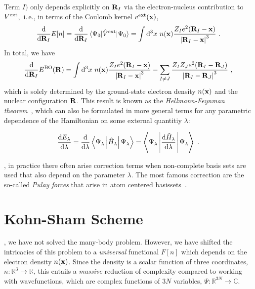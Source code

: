 Term $I)$ only depends explicitly on ${\bf R}_I$ via the electron-nucleus contribution to $V^{\rm ext}$,~i.\,e., in terms of the Coulomb kernel $v^{\rm ext} ({\bf x})$,
\begin{align}
	\frac{{\rm d}}{{\rm d} {\bf R}_I} E[n]
		= \frac{{\rm d}}{{\rm d} {\bf R}_I} \braket{\Psi_0 | \hat V ^{\rm ext} | \Psi_0} 
		= \int {\rm d}^3 x ~ n({\bf x}) \frac{Z_I e^2 ({\bf R}_I - {\bf x})}{\left\lvert {\bf R}_I - {\bf x} \right\rvert^3}~.
\end{align}
In total, we have
\begin{align}
	\frac{\d}{\d {\bf R}_I} E^{\rm BO} ({\bf R})
	= \int \d^3 x ~ n({\bf x}) \frac{Z_I e^2 ({\bf R}_I - {\bf x})}{\left\lvert {\bf R}_I - {\bf x} \right\rvert^3}
	- \sum_{I \neq J} \frac{Z_I Z_J e^2 ({\b R}_{I}-{\bf R}_{J})}{
		\left\lvert {\bf R}_{I}-{\bf R}_{J} \right\rvert^3}~,
	\label{eq:hellmannfeynman.force}
\end{align}
which is solely determined by the ground-state electron density $n ({\bf x})$ and the nuclear configuration $\bf R$. This result is known as the \emph{Hellmann-Feynman theorem}~\cite{Hellmann2015,Feynman1939}, which can also be formulated in more general terms for any parametric dependence of the Hamiltonian on some external quantitiy $\lambda$:
\begin{theorem}
\begin{align}
	\frac{{\rm d} E_{\lambda}}{{\rm d} \lambda}
		= \frac{{\rm d}}{{\rm d} \lambda}\left\langle\Psi_{\lambda} \left|\hat{H}_{\lambda}\right| \Psi_{\lambda} \right\rangle
		= \left\langle\Psi_{\lambda} \left| \frac{{\rm d} \hat{H}_{\lambda}}{{\rm d} \lambda} \right| \Psi_{\lambda} \right\rangle~.
\end{align}
\end{theorem}

, in practice there often arise correction terms when non-complete basis sets are used that also depend on the parameter $\lambda$. The most famous correction are the so-called \emph{Pulay forces} that arise in atom centered basissets~\cite{Pulay1969}.

\newpage

\section{Kohn-Sham Scheme}
, we have not solved the many-body problem. However, we have shifted the intricacies of this problem to a \emph{universal} functional $F[n]$ which depends on the electron density $n({\bf x})$. Since the density is a scalar function of three coordinates, $n: \mathds R^3 \rightarrow \mathds R$, this entails a \emph{massive} reduction of complexity compared to working with wavefunctions, which are complex functions of $3N$ variables, $\Psi: \mathds R^{3N} \rightarrow \mathds C$.

